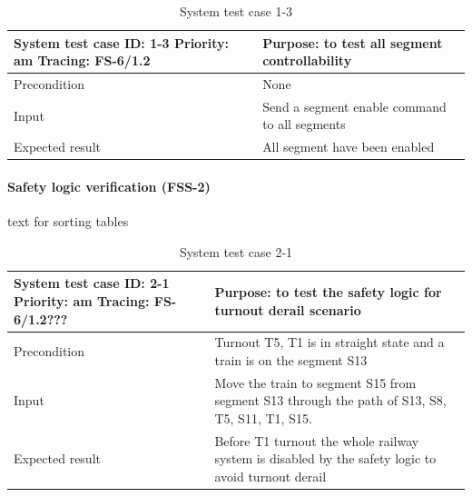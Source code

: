 \begin{table}[H]
	\caption{System test case 1-3}
	\label{table:TCase-FSS1-3}
	\begin{center}
		\renewcommand{\arraystretch}{1.8}
		\begin{tabu} 
			to 0.9 \textwidth
			{  X[0.4, c] X[c] }
			\toprule
			System test case ID: 1-3 \newline Priority: am \newline Tracing: FS-6/1.2 & Purpose: to test all segment controllability  \\ \midrule
			Precondition                                                              & None                                          \\
			Input                                                                     & Send a segment enable command to all segments \\
			Expected result                                                           & All segment have been enabled                 \\ \bottomrule
		\end{tabu}
	\end{center}
\end{table}


\paragraph{Safety logic verification (FSS-2)} text for sorting tables
\begin{table}[H]
	\caption{System test case 2-1}
	\label{table:TCase-FSS2-1}
	\begin{center}
		\renewcommand{\arraystretch}{1.8}
		\begin{tabu} 
			to 0.9 \textwidth
			{  X[0.4, c] X[c] }
			\toprule
			System test case ID: 2-1 \newline Priority: am \newline Tracing: FS-6/1.2??? & Purpose: to test the safety logic for turnout derail scenario                                 \\ \midrule
			Precondition                                                                 & Turnout T5, T1 is in straight state and a train is on the segment S13                         \\
			Input                                                                        & Move the train to segment S15 from segment S13 through the path of S13, S8, T5, S11, T1, S15. \\
			Expected result                                                              & Before T1 turnout the whole railway system is disabled by the safety logic to avoid turnout derail                    \\ \bottomrule
		\end{tabu}
	\end{center}
\end{table}

